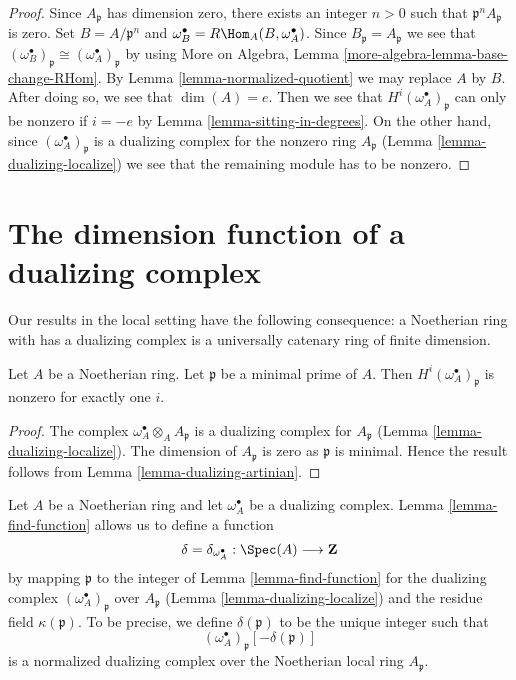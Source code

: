 \begin{proof}
Since $A_\mathfrak p$ has dimension zero, there exists an integer
$n > 0$ such that $\mathfrak p^nA_\mathfrak p$ is zero.
Set $B = A/\mathfrak p^n$ and
$\omega_B^\bullet = R\Hom_A(B, \omega_A^\bullet)$.
Since $B_\mathfrak p = A_\mathfrak p$ we see that
$(\omega_B^\bullet)_\mathfrak p \cong (\omega_A^\bullet)_\mathfrak p$
by using More on Algebra, Lemma \ref{more-algebra-lemma-base-change-RHom}.
By Lemma \ref{lemma-normalized-quotient} we may replace $A$ by $B$.
After doing so, we see that $\dim(A) = e$. Then we see that
$H^i(\omega_A^\bullet)_\mathfrak p$ can only be nonzero if $i = -e$
by Lemma \ref{lemma-sitting-in-degrees}.
On the other hand, since $(\omega_A^\bullet)_\mathfrak p$
is a dualizing complex for the nonzero ring $A_\mathfrak p$
(Lemma \ref{lemma-dualizing-localize})
we see that the remaining module has to be nonzero.
\end{proof}





\section{The dimension function of a dualizing complex}
\label{section-dimension-function}

\noindent
Our results in the local setting have the following consequence:
a Noetherian ring with has a dualizing complex is a
universally catenary ring of finite dimension.

\begin{lemma}
\label{lemma-nonvanishing-generically}
Let $A$ be a Noetherian ring. Let $\mathfrak p$ be a minimal prime
of $A$. Then $H^i(\omega_A^\bullet)_\mathfrak p$ is nonzero
for exactly one $i$.
\end{lemma}

\begin{proof}
The complex $\omega_A^\bullet \otimes_A A_\mathfrak p$
is a dualizing complex for $A_\mathfrak p$
(Lemma \ref{lemma-dualizing-localize}).
The dimension of $A_\mathfrak p$ is zero as $\mathfrak p$
is minimal. Hence the result follows from
Lemma \ref{lemma-dualizing-artinian}.
\end{proof}

\noindent
Let $A$ be a Noetherian ring and let $\omega_A^\bullet$ be a dualizing
complex. Lemma \ref{lemma-find-function} allows us to define a function
$$
\delta = \delta_{\omega_A^\bullet} : \Spec(A) \longrightarrow \mathbf{Z}
$$
by mapping $\mathfrak p$ to the integer of Lemma \ref{lemma-find-function}
for the dualizing complex $(\omega_A^\bullet)_\mathfrak p$
over $A_\mathfrak p$ (Lemma \ref{lemma-dualizing-localize})
and the residue field $\kappa(\mathfrak p)$. To be precise, we define
$\delta(\mathfrak p)$ to be the unique integer such that
$$
(\omega_A^\bullet)_\mathfrak p[-\delta(\mathfrak p)]
$$
is a normalized dualizing complex over the Noetherian local ring
$A_\mathfrak p$.

